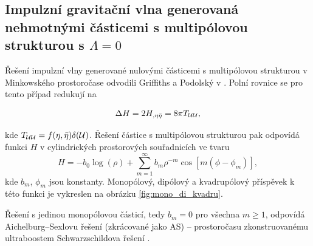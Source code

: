 \subsection{Impulzní gravitační vlna generovaná nehmotnými částicemi s multipólovou strukturou s $\Lambda=0$}

Řešení impulzní vlny generované nulovými částicemi s multipólovou strukturou v Minkowského prostoročase odvodili
Griffiths a Podolský v \cite{Griffiths_1997}. Polní rovnice se pro tento případ redukují na

\begin{equation}
    \label{eq:podminka_na_H}
    \Delta H = 2 H_{,\eta \bar{\eta}} = 8 \pi T_{\mathcal{U} \mathcal{U}},
\end{equation}
 
kde $T_{\mathcal{U} \mathcal{U}} = f(\eta, \bar{\eta}) \delta(\mathcal{U})$. Řešení částice s multipólovou strukturou pak odpovídá funkci $H$ v cylindrických prostorových souřadnicích ve tvaru
\begin{equation}
    \label{eq:multipole_minkowski}
    H = -b_0 \log(\rho) + \sum_{m=1}^\infty b_m \rho^{-m} \cos\left[ m \left(\phi - \phi_m \right) \right],
\end{equation}
kde $b_m$, $\phi_m$ jsou konstanty. Monopólový, dipólový a kvadrupólový příspěvek k této funkci je vykreslen na obrázku \ref{fig:mono_di_kvadru}.

Řešení s jedinou monopólovou částicí, tedy $b_m=0$ pro všechna $m \geq 1$, odpovídá Aichelburg--Sexlovu řešení (zkrácované jako AS) -- prostoročasu
zkonstruovanému ultraboostem Schwarzschildova řešení \cite{Aichelburg_1971}.

